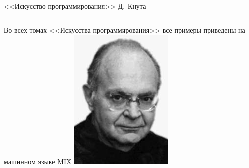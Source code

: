 \documentclass{beamer}
\begin{document}
    \begin{frame}{<<Искусство программирования>> Д.~Кнута}
        \begin{columns}
            Во всех томах <<Искусства программирования>> все примеры
            приведены на машинном языке MIX
            \includegraphics[width=\linewidth]{fig/Knuth.jpeg}
        \end{columns}
        \begin{figure}
            \begin{minipage}[h]{0.3\linewidth}

\end{minipage}
\end{figure}
\end{frame}
\end{document}
